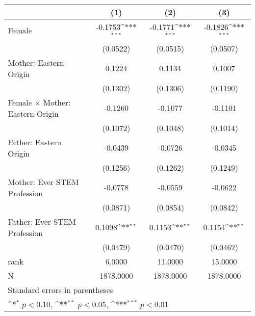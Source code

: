 {
\def\sym#1{\ifmmode^{#1}\else\(^{#1}\)\fi}
\begin{tabular}{l*{3}{c}}
\toprule
                    &\multicolumn{1}{c}{(1)}         &\multicolumn{1}{c}{(2)}         &\multicolumn{1}{c}{(3)}         \\
\midrule
Female              &     -0.1753\sym{***}&     -0.1771\sym{***}&     -0.1826\sym{***}\\
                    &    (0.0522)         &    (0.0515)         &    (0.0507)         \\
\addlinespace
Mother: Eastern Origin&      0.1224         &      0.1134         &      0.1007         \\
                    &    (0.1302)         &    (0.1306)         &    (0.1190)         \\
\addlinespace
Female $\times$ Mother: Eastern Origin&     -0.1260         &     -0.1077         &     -0.1101         \\
                    &    (0.1072)         &    (0.1048)         &    (0.1014)         \\
\addlinespace
Father: Eastern Origin&     -0.0439         &     -0.0726         &     -0.0345         \\
                    &    (0.1256)         &    (0.1262)         &    (0.1249)         \\
\addlinespace
Mother: Ever STEM Profession&     -0.0778         &     -0.0559         &     -0.0622         \\
                    &    (0.0871)         &    (0.0854)         &    (0.0842)         \\
\addlinespace
Father: Ever STEM Profession&      0.1098\sym{**} &      0.1153\sym{**} &      0.1154\sym{**} \\
                    &    (0.0479)         &    (0.0470)         &    (0.0462)         \\
\midrule
rank                &      6.0000         &     11.0000         &     15.0000         \\
N                   &   1878.0000         &   1878.0000         &   1878.0000         \\
\bottomrule
\multicolumn{4}{l}{\footnotesize Standard errors in parentheses}\\
\multicolumn{4}{l}{\footnotesize \sym{*} \(p<0.10\), \sym{**} \(p<0.05\), \sym{***} \(p<0.01\)}\\
\end{tabular}
}
